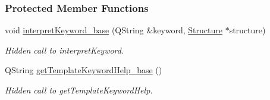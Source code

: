 \subsubsection*{Protected Member Functions}
\begin{DoxyCompactItemize}
\item 
\hypertarget{classGlobalSearch_1_1OptBase_abff4ef4b7e717351103658ff33dfa561}{}void \hyperlink{classGlobalSearch_1_1OptBase_abff4ef4b7e717351103658ff33dfa561}{interpret\+Keyword\+\_\+base} (Q\+String \&keyword, \hyperlink{classGlobalSearch_1_1Structure}{Structure} $\ast$structure)\label{classGlobalSearch_1_1OptBase_abff4ef4b7e717351103658ff33dfa561}

\begin{DoxyCompactList}\small\item\em Hidden call to interpret\+Keyword. \end{DoxyCompactList}\item 
\hypertarget{classGlobalSearch_1_1OptBase_a41a41f9733da4a68244bc56195ea835b}{}Q\+String \hyperlink{classGlobalSearch_1_1OptBase_a41a41f9733da4a68244bc56195ea835b}{get\+Template\+Keyword\+Help\+\_\+base} ()\label{classGlobalSearch_1_1OptBase_a41a41f9733da4a68244bc56195ea835b}

\begin{DoxyCompactList}\small\item\em Hidden call to get\+Template\+Keyword\+Help. \end{DoxyCompactList}\end{DoxyCompactItemize}
